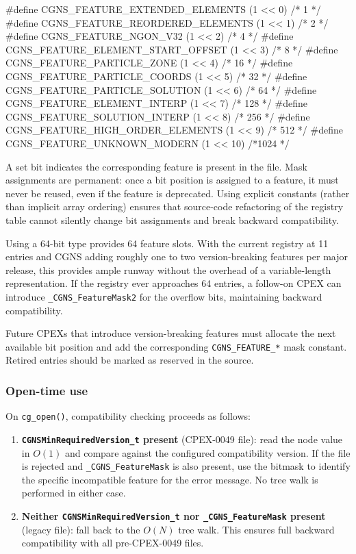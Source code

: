 \documentclass[11pt,letterpaper]{article}
\makeatletter
\let\cgns@orig@lstlisting\lstlisting
\let\cgns@endorig@lstlisting\endlstlisting
\renewenvironment{lstlisting}
  {\par\needspace{5\baselineskip}\nolinenumbers\cgns@orig@lstlisting}
  {\cgns@endorig@lstlisting\par\linenumbers}
\makeatother
\begin{document}
\begin{lstlisting}[language=C]
#define CGNS_FEATURE_EXTENDED_ELEMENTS     (1 <<  0)  /*   1 */
#define CGNS_FEATURE_REORDERED_ELEMENTS    (1 <<  1)  /*   2 */
#define CGNS_FEATURE_NGON_V32              (1 <<  2)  /*   4 */
#define CGNS_FEATURE_ELEMENT_START_OFFSET  (1 <<  3)  /*   8 */
#define CGNS_FEATURE_PARTICLE_ZONE         (1 <<  4)  /*  16 */
#define CGNS_FEATURE_PARTICLE_COORDS       (1 <<  5)  /*  32 */
#define CGNS_FEATURE_PARTICLE_SOLUTION     (1 <<  6)  /*  64 */
#define CGNS_FEATURE_ELEMENT_INTERP        (1 <<  7)  /* 128 */
#define CGNS_FEATURE_SOLUTION_INTERP       (1 <<  8)  /* 256 */
#define CGNS_FEATURE_HIGH_ORDER_ELEMENTS   (1 <<  9)  /* 512 */
#define CGNS_FEATURE_UNKNOWN_MODERN        (1 << 10)  /*1024 */
\end{lstlisting}

A set bit indicates the corresponding feature is present in the file.
Mask assignments are permanent: once a bit position is assigned to a
feature, it must never be reused, even if the feature is deprecated.
Using explicit constants (rather than implicit array ordering) ensures
that source-code refactoring of the registry table cannot silently
change bit assignments and break backward compatibility.

Using a 64-bit type provides 64 feature slots.  With the current
registry at 11 entries and CGNS adding roughly one to two
version-breaking features per major release, this provides ample
runway without the overhead of a variable-length representation.
If the registry ever approaches 64 entries, a follow-on CPEX can
introduce \texttt{\_CGNS\_FeatureMask2} for the overflow bits,
maintaining backward compatibility.

Future CPEXs that introduce version-breaking features must allocate
the next available bit position and add the corresponding
\texttt{CGNS\_FEATURE\_*} mask constant.  Retired entries should be
marked as reserved in the source.

\subsubsection{Open-time use}

On \texttt{cg\_open()}, compatibility checking proceeds as follows:

\begin{enumerate}[leftmargin=2em]
\item \textbf{\texttt{CGNSMinRequiredVersion\_t} present}
  (CPEX-0049 file): read the node value in $O(1)$ and compare
  against the configured compatibility version.  If the file is
  rejected and \texttt{\_CGNS\_FeatureMask} is also present, use
  the bitmask to identify the specific incompatible feature for the
  error message.  No tree walk is performed in either case.
\item \textbf{Neither \texttt{CGNSMinRequiredVersion\_t} nor
  \texttt{\_CGNS\_FeatureMask} present} (legacy file):
  fall back to the $O(N)$ tree walk.  This ensures full backward
  compatibility with all pre-CPEX-0049 files.
\end{enumerate}
\end{document}
